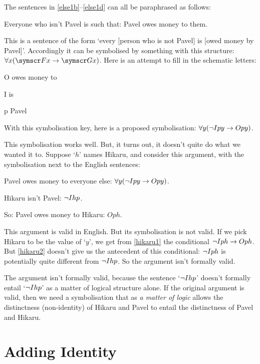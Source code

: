 The sentences in \ref{else1b}–\ref{else1d} can all be paraphrased as follows:
\begin{earg}
	\item[\ex{else1e}] Everyone who isn't Pavel is such that: Pavel owes money to them.
\end{earg} This is a sentence of the form `every  [person who is not Pavel] is  [owed money by Pavel]'. Accordingly it can be symbolised by something with this structure: $\forall x (\meta{F}x \eif \meta{G}x)$. Here is an attempt to fill in the schematic letters:
	\begin{ekey}
		\item[O]  owes money to 
		\item[I]  is 
		\item[p] Pavel
	\end{ekey}
With this symbolisation  key, here is a proposed symbolisation: $\forall y (\neg Ipy \rightarrow Opy)$. 

This symbolisation works well. But, it turns out, it doesn't quite do what we wanted it to. Suppose `$h$' names Hikaru, and consider this argument, with the symbolisation next to the English sentences:
\begin{earg}
	\item[\ex{hikaru1}] Pavel owes money to everyone else: $\forall y (\neg Ipy \rightarrow Opy)$.
	\item[\ex{hikaru2}] Hikaru isn't Pavel: $\neg Ihp$.
	\item[So:] Pavel owes money to Hikaru: $Oph$.
\end{earg}This argument is valid in English. But its symbolisation is not valid. If we pick Hikaru to be the value of `$y$', we get from \ref{hikaru1} the conditional $\neg Iph \rightarrow Oph$. But \ref{hikaru2} doesn't give us the antecedent of this conditional: $\neg Iph$ is potentially quite different from $\neg Ihp$. So the argument isn't formally valid.

The argument isn't formally valid, because the sentence `$\neg Ihp$' doesn't formally entail `$\neg Ihp$' as a matter of logical structure alone. If the original argument is valid, then we need a symbolisation that as \emph{a matter of logic} allows the distinctness (non-identity) of Hikaru and Pavel to entail the distinctness of Pavel and Hikaru.  

\section{Adding Identity}


